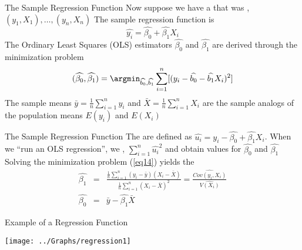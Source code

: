 \begin{frame}{The Sample Regression Function}
Now suppose we have a  that was , $(y_1, X_1), \dots, (y_n, X_n)$
\vfill
The sample regression function is 
\begin{equation}
\widehat{y_i}=\widehat{\beta_0} + \widehat{\beta_1} X_i
\label{eq13}
\end{equation}
\vfill
The Ordinary Least Squares (OLS) estimators $\widehat{\beta_0}$ and $\widehat{\beta_1}$ are derived through the minimization problem
\begin{equation}
(\widehat{\beta_0}, \widehat{\beta_1})=\displaystyle\argmin_{\widehat{b_0}, \widehat{b_1}} \displaystyle\sum_{i=1}^n[(y_i-\widehat{b_0}-\widehat{b_1}X_i)^2]
\label{eq14}
\end{equation}
\vfill
The sample means $\bar{y}=\frac{1}{n}\displaystyle\sum_{i=1}^n y_i$ and $\bar{X}=\frac{1}{n}\displaystyle\sum_{i=1}^n X_i$ are the sample analogs of the population means $E(y_i)$ and $E(X_i)$
\end{frame}

\begin{frame}{The Sample Regression Function}
The  are defined as $\widehat{u_i}=y_i-\widehat{\beta_0} + \widehat{\beta_1} X_i$. 
\vfill
When we ``run an OLS regression'', we , $\displaystyle\sum_{i=1}^n \widehat{u_i}^2$ and obtain values for $\widehat{\beta_0}$ and $\widehat{\beta_1}$
\vfill
\pause
Solving the minimization problem (\ref{eq14}) yields the 
\begin{eqnarray}
\widehat{\beta_1}&=&\frac{\frac{1}{n}\sum_{i=1}^n (y_i - \bar{y})(X_i-\bar{X})}{\frac{1}{n}\sum_{i=1}^n (X_i-\bar{X})^2}=\frac{\widehat{Cov(y_i, X_i)}}{\widehat{V(X_i)}}\\
\widehat{\beta_0}&=&\bar{y}-\widehat{\beta_1}\bar{X} 
\nonumber
\label{eq15}
\end{eqnarray}
\end{frame}

\begin{frame}{Example of a Regression Function}
\begin{center}
\texttt{[image: ../Graphs/regression1]}
\end{center}
\end{frame}



